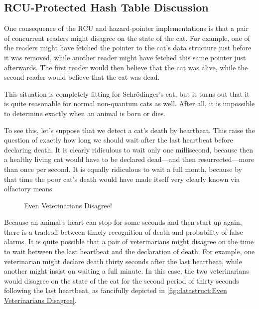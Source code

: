 
\subsection{RCU-Protected Hash Table Discussion}
\label{sec:datastruct:RCU-Protected Hash Table Discussion}

One consequence of the RCU and hazard-pointer implementations is
that a pair of concurrent readers might disagree on the state of
the cat.
For example, one of the readers might have fetched the pointer to
the cat's data structure just before it was removed, while another
reader might have fetched this same pointer just afterwards.
The first reader would then believe that the cat was alive, while
the second reader would believe that the cat was dead.

This situation is completely fitting for Schr\"odinger's
cat, but it turns out that it is quite reasonable for normal
non-quantum cats as well.
After all, it is impossible to determine exactly when an animal is born
or dies.

To see this, let's suppose that we detect a cat's death by heartbeat.
This raise the question of exactly how long we should wait after the
last heartbeat before declaring death.
It is clearly ridiculous to wait only one millisecond, because then
a healthy living cat would have to be declared dead---and then
resurrected---more than once per second.
It is equally ridiculous to wait a full month, because by that time
the poor cat's death would have made itself very clearly known
via olfactory means.

\begin{figure}
\centering
{}
\caption{Even Veterinarians Disagree!}
\end{figure}

Because an animal's heart can stop for some seconds and then start up
again, there is a tradeoff between timely recognition of death and
probability of false alarms.
It is quite possible that a pair of veterinarians might disagree on
the time to wait between the last heartbeat and the declaration of
death.
For example, one veterinarian might declare death thirty seconds after
the last heartbeat, while another might insist on waiting a full
minute.
In this case, the two veterinarians would disagree on the state of the
cat for the second period of thirty seconds following the last heartbeat,
as fancifully depicted in
\cref{fig:datastruct:Even Veterinarians Disagree}.

